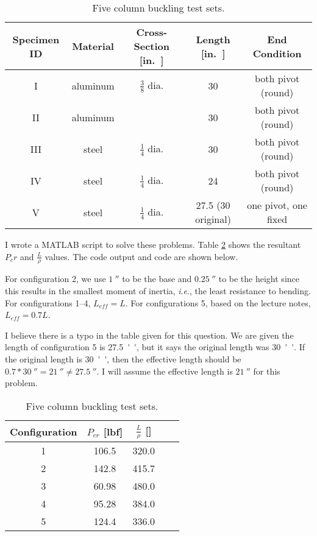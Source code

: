 \documentclass[12 pt]{article}
\newcommand{\ie}{\textit{i}.\textit{e}., }
\begin{document}
\begin{table}[!htbp]
\caption{Five column buckling test sets.}
\begin{center}
	\begin{tabular}{|c|c|c|c|c|}
		\hline
		Specimen ID&Material&Cross-Section [\unit{in.}]&Length [\unit{in.}]&End Condition\\
		\hline
		I&aluminum&$\frac{3}{8}$ dia.&\num{30}&both pivot (round)\\
		\hline
		II&aluminum&\numproduct{0.25x1}&\num{30}&both pivot (round)\\
		\hline
		III&steel&$\frac{1}{4}$ dia.&\num{30}&both pivot (round)\\
		\hline
		IV&steel&$\frac{1}{4}$ dia.&\num{24}&both pivot (round)\\
		\hline
		V&steel&$\frac{1}{4}$ dia.&\num{27.5} (\num{30} original)&one pivot, one fixed\\
		\hline
	\end{tabular}
\end{center}
\label{tbl:question_4_data}
\end{table}

I wrote a MATLAB script to solve these problems. Table \ref{tbl:data} shows the resultant $P_cr$ and $\frac{L}{\rho}$ values. The code output and code are shown below.

For configuration \num{2}, we use $\qty{1}{''}$ to be the base and $\qty{0.25}{''}$ to be the height since this results in the smallest moment of inertia, \ie the least resistance to bending. For configurations \numrange{1}{4}, $L_{eff}=L$. For configurations \num{5}, based on the lecture notes, $L_{eff}=0.7L$.

I believe there is a typo in the table given for this question. We are given the length of configuration \num{5} is \qty{27.5}{''}, but it says the original length was \qty{30}{''}. If the original length is \qty{30}{''}, then the effective length should be $0.7*\qty{30}{''}=\qty{21}{''}\ne\qty{27.5}{''}$. I will assume the effective length is $\qty{21}{''}$ for this problem.

\begin{table}[!htbp]
\caption{Five column buckling test sets.}
\begin{center}
	\begin{tabular}{|c|c|c|c|c|}
		\hline
		Configuration&$P_{cr}$ [\unit{lbf}]&$\frac{L}{\rho}$ []\\
		\hline
		1&106.5&320.0\\
		\hline
		2&142.8&415.7\\
		\hline
		3&60.98&480.0\\
		\hline
		4&95.28&384.0\\
		\hline
		5&124.4&336.0\\
		\hline
	\end{tabular}
\end{center}
\label{tbl:data}
\end{table}
\end{document}
